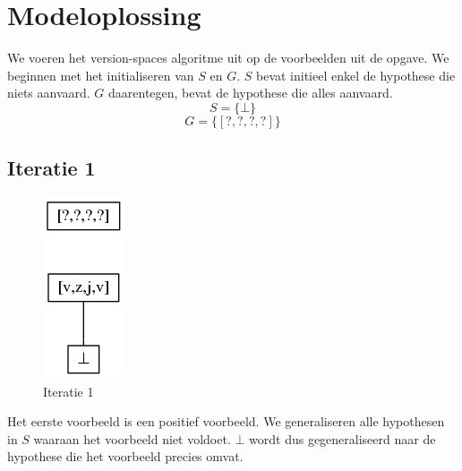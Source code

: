 \documentclass[alternative-exam.tex]{subfiles}
\begin{document}
\section{Modeloplossing}
We voeren het version-spaces algoritme uit op de voorbeelden uit de opgave. We beginnen met het initialiseren van $S$ en $G$. $S$ bevat initieel enkel de hypothese die niets aanvaard. $G$ daarentegen, bevat de hypothese die alles aanvaard.
\[
S = \{\bot\}
\]
\[
G = \{[?,?,?,?]\}
\]
\subsection{Iteratie 1}
\begin{figure}
[H]
\centering
\caption{Iteratie 1}
\label{iter_1}
\includegraphics[scale=0.5]{resources/graphs/iteration_1.png}
\end{figure}
Het eerste voorbeeld is een positief voorbeeld. We generaliseren alle hypothesen in $S$ waaraan het voorbeeld niet voldoet. $\bot$ wordt dus gegeneraliseerd naar de hypothese die het voorbeeld precies omvat. 
\end{document}
